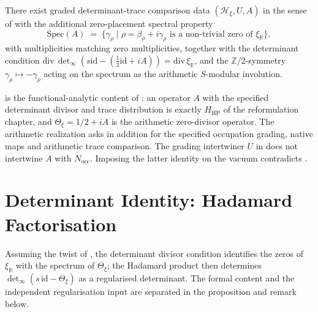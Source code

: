 \begin{hypothesis}
\label{v4-arith:w5-b:hyp:twist-existence}
There exist graded determinant-trace comparison data \((\mathcal{H}_{\xi},U,A)\) in
the sense of  with the additional
zero-placement spectral property
\begin{equation}
\label{v4-arith:w5-b:eq:spec-A}
\mathrm{Spec}(A)\;=\;\{\gamma_{\rho}\mid\rho=\beta_{\rho}+i\gamma_{\rho}
\text{ is a non-trivial zero of }\xi_{\mathbb R}\},
\end{equation}
with multiplicities matching zero multiplicities, together with the
determinant condition
\(\mathrm{div}\,\det_{\infty}(s\mathrm{id}-(\tfrac12\mathrm{id}+iA))
=\mathrm{div}\,\xi_{\mathbb R}\), and the
\(\mathbb{Z}/2\)-symmetry \(\gamma_{\rho}\mapsto-\gamma_{\rho}\) acting on
the spectrum as the arithmetic \(S\)-modular involution.
\end{hypothesis}

\begin{remark}
\label{v4-arith:w5-b:rem:equals-HPAr}
 is the functional-analytic
content of : an operator \(A\) with the
specified determinant divisor and trace distribution is exactly
\(H_{\mathrm{HP}}\) of the reformulation chapter, and
\(\Theta_{\xi}=1/2+iA\) is the arithmetic zero-divisor operator.
The arithmetic realization asks in addition for the specified occupation
grading, native maps and arithmetic trace comparison. The grading
intertwiner \(U\) in  does not intertwine
\(A\) with \(N_{\mathrm{occ}}\). Imposing the latter identity on the
vacuum contradicts .
\end{remark}

\section{Determinant Identity: Hadamard Factorisation}
\label{v4-arith:w5-b:determinant}

Assuming the twist of , the
determinant divisor condition identifies the zeros of
\(\xi_{\mathbb{R}}\) with the spectrum of \(\Theta_{\xi}\); the
Hadamard product then determines
\(\det_{\infty}(s\,\mathrm{id}-\Theta_{\xi})\) as a regularised
determinant. The formal content and the independent
regularisation input are separated in the proposition and remark
below.


